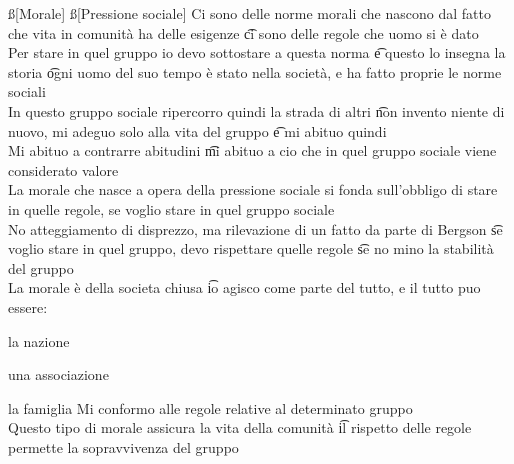 \documentclass[12pt]{article}
\begin{document}
\ss[Morale]
\ss[Pressione sociale]
Ci sono delle norme morali che nascono dal fatto che vita in comunità ha delle esigenze \t ci sono delle regole che uomo si è dato \\
Per stare in quel gruppo io devo sottostare a questa norma \t e questo lo insegna la storia \t ogni uomo del suo tempo è stato nella società, e ha fatto proprie le norme sociali \\
In questo gruppo sociale ripercorro quindi la strada di altri \t non invento niente di nuovo, mi adeguo solo alla vita del gruppo \t e mi abituo quindi \\
Mi abituo a contrarre abitudini \t mi abituo a cio che in quel gruppo sociale viene considerato valore \\
La morale che nasce a opera della pressione sociale si fonda sull'obbligo di stare in quelle regole, se voglio stare in quel gruppo sociale \\
No atteggiamento di disprezzo, ma rilevazione di un fatto da parte di Bergson \t se voglio stare in quel gruppo, devo rispettare quelle regole \t se no mino la stabilità del gruppo \\
La morale è della societa chiusa \t io agisco come parte del tutto, e il tutto puo essere:
\bi
  \item la nazione
  \item una associazione
  \item la famiglia
\ei
Mi conformo alle regole relative al determinato gruppo \\
Questo tipo di morale assicura la vita della comunità \t il rispetto delle regole permette la sopravvivenza del gruppo
\end{document}
